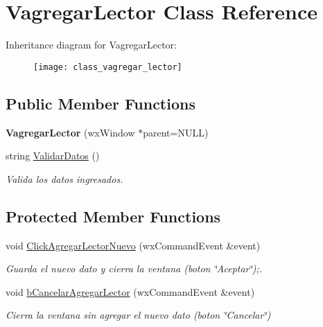 \hypertarget{class_vagregar_lector}{}\section{Vagregar\+Lector Class Reference}
\label{class_vagregar_lector}
Inheritance diagram for Vagregar\+Lector\+:\begin{figure}[H]
\begin{center}
\leavevmode
\texttt{[image: class\_vagregar\_lector]}
\end{center}
\end{figure}
\subsection*{Public Member Functions}
\begin{DoxyCompactItemize}
\item 
{\bfseries Vagregar\+Lector} (wx\+Window $\ast$parent=N\+U\+LL)\hypertarget{class_vagregar_lector_abc442f5eb56f5bd5aa2e66db3a21f152}{}\label{class_vagregar_lector_abc442f5eb56f5bd5aa2e66db3a21f152}

\item 
string \hyperlink{class_vagregar_lector_a07c86c6aed75c052619bbae01fa8434c}{Validar\+Datos} ()\hypertarget{class_vagregar_lector_a07c86c6aed75c052619bbae01fa8434c}{}\label{class_vagregar_lector_a07c86c6aed75c052619bbae01fa8434c}

\begin{DoxyCompactList}\small\item\em Valida los datos ingresados. \end{DoxyCompactList}\end{DoxyCompactItemize}
\subsection*{Protected Member Functions}
\begin{DoxyCompactItemize}
\item 
void \hyperlink{class_vagregar_lector_aac8aa34d70f414512439db50aef17151}{Click\+Agregar\+Lector\+Nuevo} (wx\+Command\+Event \&event)\hypertarget{class_vagregar_lector_aac8aa34d70f414512439db50aef17151}{}\label{class_vagregar_lector_aac8aa34d70f414512439db50aef17151}

\begin{DoxyCompactList}\small\item\em Guarda el nuevo dato y cierra la ventana (boton \char`\"{}\+Aceptar\char`\"{});. \end{DoxyCompactList}\item 
void \hyperlink{class_vagregar_lector_a88c689837ca54ff3425bbbb31cde0c7d}{b\+Cancelar\+Agregar\+Lector} (wx\+Command\+Event \&event)\hypertarget{class_vagregar_lector_a88c689837ca54ff3425bbbb31cde0c7d}{}\label{class_vagregar_lector_a88c689837ca54ff3425bbbb31cde0c7d}

\begin{DoxyCompactList}\small\item\em Cierra la ventana sin agregar el nuevo dato (boton \char`\"{}\+Cancelar\char`\"{}) \end{DoxyCompactList}\end{DoxyCompactItemize}
